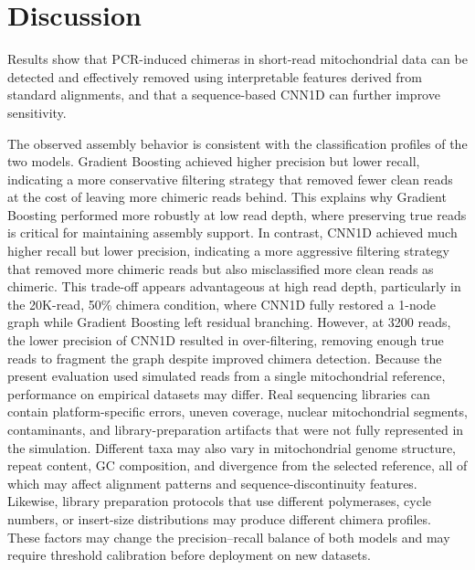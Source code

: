 \section{Discussion}
Results show that PCR-induced chimeras in short-read mitochondrial data can be detected and effectively removed using interpretable features derived from standard alignments, and that a sequence-based CNN1D can further improve sensitivity.

The observed assembly behavior is consistent with the classification profiles of the two models. Gradient Boosting achieved higher precision but lower recall, indicating a more conservative filtering strategy that removed fewer clean reads at the cost of leaving more chimeric reads behind. This explains why Gradient Boosting performed more robustly at low read depth, where preserving true reads is critical for maintaining assembly support. In contrast, CNN1D achieved much higher recall but lower precision, indicating a more aggressive filtering strategy that removed more chimeric reads but also misclassified more clean reads as chimeric. This trade-off appears advantageous at high read depth, particularly in the 20K-read, 50\% chimera condition, where CNN1D fully restored a 1-node graph while Gradient Boosting left residual branching. However, at 3200 reads, the lower precision of CNN1D resulted in over-filtering, removing enough true reads to fragment the graph despite improved chimera detection. Because the present evaluation used simulated reads from a single mitochondrial reference, performance on empirical datasets may differ. Real sequencing libraries can contain platform-specific errors, uneven coverage, nuclear mitochondrial segments, contaminants, and library-preparation artifacts that were not fully represented in the simulation. Different taxa may also vary in mitochondrial genome structure, repeat content, GC composition, and divergence from the selected reference, all of which may affect alignment patterns and sequence-discontinuity features. Likewise, library preparation protocols that use different polymerases, cycle numbers, or insert-size distributions may produce different chimera profiles. These factors may change the precision--recall balance of both models and may require threshold calibration before deployment on new datasets.